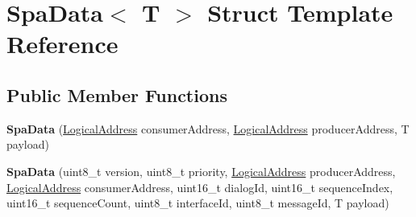 \hypertarget{structSpaData}{}\section{Spa\+Data$<$ T $>$ Struct Template Reference}
\label{structSpaData}
\subsection*{Public Member Functions}
\begin{DoxyCompactItemize}
\item 
\mbox{\label{structSpaData_a5039d8b49c2afb236fdaacc27341f8ce}} 
{\bfseries Spa\+Data} (\hyperlink{structLogicalAddress}{Logical\+Address} consumer\+Address, \hyperlink{structLogicalAddress}{Logical\+Address} producer\+Address, T payload)
\item 
\mbox{\label{structSpaData_ae9bf86197e7b21b5a37a1e1b2de76320}} 
{\bfseries Spa\+Data} (uint8\+\_\+t version, uint8\+\_\+t priority, \hyperlink{structLogicalAddress}{Logical\+Address} producer\+Address, \hyperlink{structLogicalAddress}{Logical\+Address} consumer\+Address, uint16\+\_\+t dialog\+Id, uint16\+\_\+t sequence\+Index, uint16\+\_\+t sequence\+Count, uint8\+\_\+t interface\+Id, uint8\+\_\+t message\+Id, T payload)
\end{DoxyCompactItemize}
